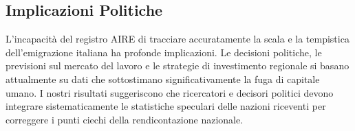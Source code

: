 \subsection{Implicazioni Politiche}
L'incapacità del registro AIRE di tracciare accuratamente la scala e la tempistica dell'emigrazione italiana ha profonde implicazioni.
Le decisioni politiche, le previsioni sul mercato del lavoro e le strategie di investimento regionale si basano attualmente su dati che sottostimano significativamente la fuga di capitale umano.
I nostri risultati suggeriscono che ricercatori e decisori politici devono integrare sistematicamente le statistiche speculari delle nazioni riceventi per correggere i punti ciechi della rendicontazione nazionale.
